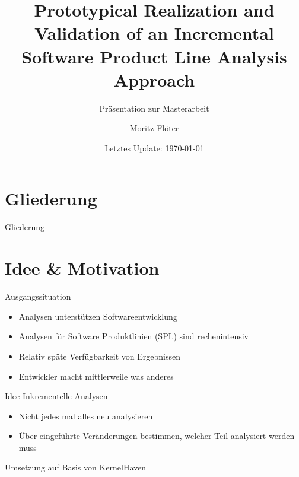\documentclass[aspectratio=43, noserifmath]{beamer}
\title{Prototypical Realization and Validation of an Incremental Software Product Line Analysis Approach}
\subtitle{Pr\"asentation zur Masterarbeit}
\date{Letztes Update: \today}
\author{Moritz Fl\"oter}
\institute{\textbf{Universit\"at Hildesheim}}
\begin{document}

\maketitle


\section*{Gliederung}
\begin{frame}{Gliederung}
	\tableofcontents[hideallsubsections]

\end{frame}


\section{Idee \& Motivation}

\begin{frame}{Ausgangssituation}
\begin{itemize}
        \item[\textbullet] Analysen unterst\"utzen Softwareentwicklung
        \item[\textbullet] Analysen f\"ur Software Produktlinien (SPL) sind rechenintensiv
        \item[\textbullet] Relativ sp\"ate Verf\"ugbarkeit von Ergebnissen
        \item[\textbullet] Entwickler macht mittlerweile was anderes
\end{itemize}
\end{frame}


\begin{frame}{Idee}
Inkrementelle Analysen
\begin{itemize}
    \item[\textbullet] Nicht jedes mal alles neu analysieren
    \item[\textbullet] \"Uber eingef\"uhrte Ver\"anderungen bestimmen, welcher Teil analysiert werden muss 
\end{itemize}

Umsetzung auf Basis von KernelHaven

\end{frame}
\end{document}
